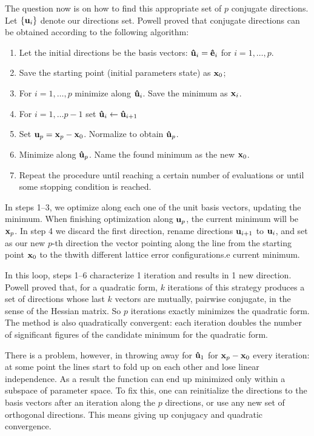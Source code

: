 The question now is on how to find this appropriate set of $p$ conjugate directions. Let $\{\vb{u}_i\}$ denote our directions set. Powell \cite{powell_efficient_1964} proved that conjugate directions can be obtained according to the following algorithm:
\begin{enumerate}
    \item Let the initial directions be the basis vectors: $\vu{u}_i=\vu{e}_i$ for $i=1,\dots, p$.
    \item Save the starting point (initial parameters state) as $\vb{x}_0$;
    \item For $i=1,\dots, p$ minimize along $\vu{u}_i$. Save the minimum as $\vb{x}_i$.
    \item For $i=1,\dots p-1$ set $\vu{u}_i\leftarrow\vu{u}_{i+1}$
    \item Set $\vb{u}_p=\vb{x}_p - \vb{x}_0$. Normalize to obtain $\vu{u}_p$.
    \item Minimize along $\vu{u}_p$. Name the found minimum as the new $\vb{x}_0$.
    \item Repeat the procedure until reaching a certain number of evaluations or until some stopping condition is reached.
\end{enumerate}

In steps 1--3, we optimize along each one of the unit basis vectors, updating the minimum. When finishing optimization along $\vb{u}_p$, the current minimum will be $\vb{x}_p$. In step 4 we discard the first direction, rename directions $\vb{u}_{i+1}$ to $\vb{u}_i$, and set as our new $p$-th direction the vector pointing along the line from the starting point $\vb{x}_0$ to the thwith different lattice error configurations.e current minimum.

In this loop, steps 1--6 characterize 1 iteration and results in 1 new direction. Powell proved that, for a quadratic form, $k$ iterations of this strategy produces a set of directions whose last $k$ vectors are mutually, pairwise conjugate, in the sense of the Hessian matrix. So $p$ iterations exactly minimizes the quadratic form. The method is also quadratically convergent: each iteration doubles the number of significant figures of the candidate minimum for the quadratic form.

There is a problem, however, in throwing away  for $\vu{u}_1$ for $\vb{x}_p - \vb{x}_0$ every iteration: at some point the lines start to fold up on each other and lose linear independence. As a result the function can end up minimized only within a subspace of parameter space. To fix this, one can reinitialize the directions to the basis vectors after an iteration along the $p$ directions, or use any new set of orthogonal directions. This means giving up conjugacy and quadratic convergence.

